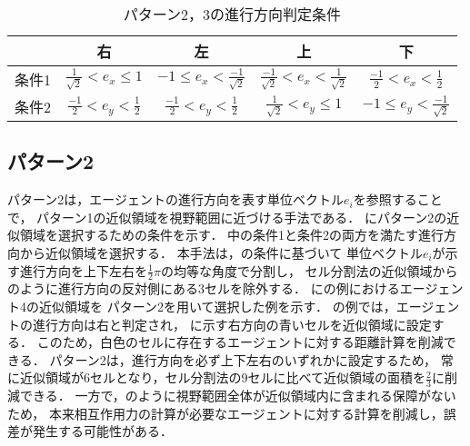
\begin{table}[t]
	\centering
	\caption{パターン2，3の進行方向判定条件}
	\label{tb:patan2_joken}
	\begin{tabular}{c|cccc}
		\hline \hline
		& 右 & 左 & 上 & 下  \\ \hline
		条件1
		& $\frac{1}{\sqrt{2}} < e_x \leq 1$
		& $ -1 \leq e_x < \frac{-1}{\sqrt{2}}$
		& $ \frac{-1}{\sqrt{2}} < e_x < \frac{1}{\sqrt{2}}$
		& $ \frac{-1}{2} < e_x < \frac{1}{2} $ \\ \hline
		条件2 
		& $\frac{-1}{2} < e_y < \frac{1}{2} $ 
		& $\frac{-1}{2} < e_y < \frac{1}{2} $
  	& $ \frac{1}{\sqrt{2}} < e_y \leq 1$
		& $ -1 \leq e_y < \frac{-1}{\sqrt{2}} $ \\ \hline
	\end{tabular}
\end{table}

\subsection{パターン2}
パターン2は，エージェントの進行方向を表す単位ベクトル$e_{i}$を参照することで，
パターン1の近似領域を視野範囲に近づける手法である\cite{katayose}．
にパターン2の近似領域を選択するための条件を示す．
中の条件1と条件2の両方を満たす進行方向から近似領域を選択する．
本手法は，の条件に基づいて
単位ベクトル$e_{i}$が示す進行方向を上下左右を$\frac{1}{2}\pi$の均等な角度で分割し，
セル分割法の近似領域からのように進行方向の反対側にある3セルを除外する．
にの例におけるエージェント4の近似領域を
パターン2を用いて選択した例を示す．
の例では，エージェントの進行方向は右と判定され，
に示す右方向の青いセルを近似領域に設定する．
このため，白色のセルに存在するエージェントに対する距離計算を削減できる．
パターン2は，進行方向を必ず上下左右のいずれかに設定するため，
常に近似領域が6セルとなり，セル分割法の9セルに比べて近似領域の面積を$\frac{2}{3}$に削減できる．
一方で，のように視野範囲全体が近似領域内に含まれる保障がないため，
本来相互作用力の計算が必要なエージェントに対する計算を削減し，誤差が発生する可能性がある．


